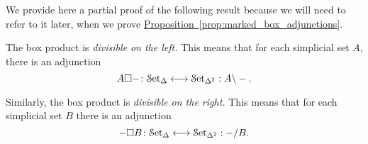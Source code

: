 \documentclass[main.tex]{subfiles}
\begin{document}
We provide here a partial proof of the following result because we will need to refer to it later, when we prove \hyperref[prop:marked_box_adjunctions]{Proposition~\ref*{prop:marked_box_adjunctions}}.
\begin{proposition}
  \label{prop:bijection_exhibiting_box_divisibility}
  The box product is \emph{divisible on the left.} This means that for each simplicial set $A$, there is an adjunction
  \begin{equation*}
    A \square -\colon \mathcal{S}\mathrm{et}_{\Delta} \longleftrightarrow \mathcal{S}\mathrm{et}_{\Delta^{2}} : A \backslash -.
  \end{equation*}

  Similarly, the box product is \emph{divisible on the right.} This means that for each simplicial set $B$ there is an adjunction
  \begin{equation*}
    - \square B\colon \mathcal{S}\mathrm{et}_{\Delta} \longleftrightarrow \mathcal{S}\mathrm{et}_{\Delta^{2}} : - / B.
  \end{equation*}
\end{proposition}
\end{document}
